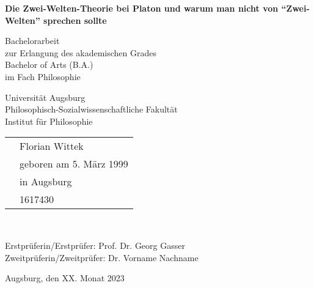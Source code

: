 \begin{titlepage}
	\begin{center}
		\vspace*{1cm}
		
		\textbf{\LARGE Die Zwei-Welten-Theorie bei Platon und warum man nicht von \enquote{Zwei-Welten} sprechen sollte}
		
		\vspace{0.5cm}
		\large
		
		Bachelorarbeit\\
		zur Erlangung des akademischen Grades\\
		Bachelor of Arts (B.A.)\\
		im Fach Philosophie\\
		\vspace {1.5cm}
	\end{center}
	\vspace{2.5cm}
	\raggedright
		Universität Augsburg\\
		Philosophisch-Sozialwissenschaftliche Fakultät\\
		Institut für Philosophie\\
		
		\vspace{1.5cm}
		
		\begin{tabular}{@{}ll}
			\makebox[2.5cm][l]{eingereicht von:} & \hspace{2cm} Florian Wittek\\
			& \hspace{2cm} geboren am 5. März 1999\\
			& \hspace{2cm} in Augsburg\\
			& \hspace{2cm} 1617430\\
		\end{tabular}\\	
		\vspace{1.5cm}

		Erstprüferin/Erstprüfer: \hspace{2cm} Prof. Dr. Georg Gasser\\
		Zweitprüferin/Zweitprüfer: \hspace{1.4cm} Dr. Vorname Nachname

		\vfill
		Augsburg, den \hspace{2.4cm} XX. Monat 2023
		
	
\end{titlepage}